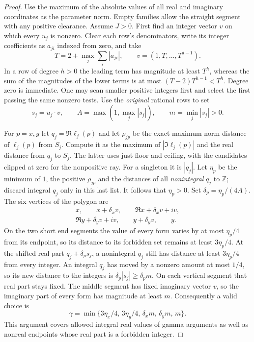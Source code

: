 \begin{proof}
Use the maximum of the absolute values of all real and imaginary coordinates as the parameter norm. Empty families allow the straight segment with any positive clearance. Assume $J>0$. First find an integer vector $v$ on which every $u_j$ is nonzero. Clear each row's denominators, write its integer coefficients as $a_{ji}$ indexed from zero, and take
\[
 T=2+\max_j\sum_i|a_{ji}|,\qquad v=(1,T,\ldots,T^{d-1}).
\]
In a row of degree $h>0$ the leading term has magnitude at least $T^h$, whereas the sum of the magnitudes of the lower terms is at most $(T-2)T^{h-1}<T^h$. Degree zero is immediate. One may scan smaller positive integers first and select the first passing the same nonzero tests. Use the \emph{original} rational rows to set
\[
 s_j=u_j\cdot v,\qquad A=\max(1,\max_j|s_j|),\qquad m=\min_j|s_j|>0 .
\]

For $p=x,y$ let $q_j=\Re\ell_j(p)$ and let $\rho_{jp}$ be the exact maximum-norm distance of $\ell_j(p)$ from $S_j$. Compute it as the maximum of $|\Im\ell_j(p)|$ and the real distance from $q_j$ to $S_j$. The latter uses just floor and ceiling, with the candidates clipped at zero for the nonpositive ray. For a singleton it is $|q_j|$. Let $\eta_p$ be the minimum of $1$, the positive $\rho_{jp}$ and the distances of all \emph{nonintegral} $q_j$ to $\mathbb Z$; discard integral $q_j$ only in this last list. It follows that $\eta_p>0$. Set $\delta_p=\eta_p/(4A)$. The six vertices of the polygon are
\[
 \begin{gathered}
 x,\qquad x+\delta_xv,\qquad \Re x+\delta_xv+i v,\\
 \Re y+\delta_yv+i v,\qquad y+\delta_y v,\qquad y .
 \end{gathered}
\]
On the two short end segments the value of every form varies by at most $\eta_p/4$ from its endpoint, so its distance to its forbidden set remains at least $3\eta_p/4$. At the shifted real part $q_j+\delta_p s_j$, a nonintegral $q_j$ still has distance at least $3\eta_p/4$ from every integer. An integral $q_j$ has moved by a nonzero amount at most $1/4$, so its new distance to the integers is $\delta_p|s_j|\ge\delta_pm$. On each vertical segment that real part stays fixed. The middle segment has fixed imaginary vector $v$, so the imaginary part of every form has magnitude at least $m$. Consequently a valid choice is
\[
 \gamma=\min\{3\eta_x/4,\,3\eta_y/4,\,\delta_xm,\,\delta_ym,\,m\}.
\]
This argument covers allowed integral real values of gamma arguments as well as nonreal endpoints whose real part is a forbidden integer.


\end{proof}
